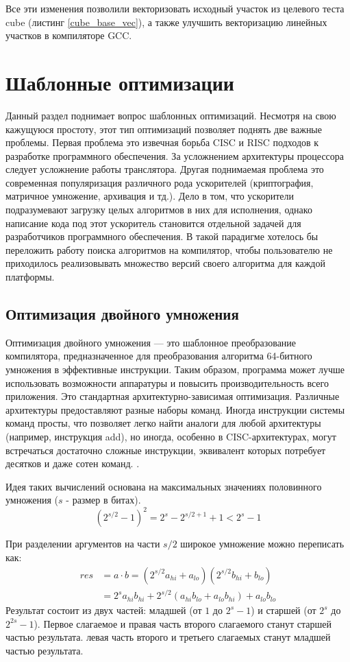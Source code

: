 Все эти изменения позволили векторизовать исходный участок из целевого теста cube (листинг \ref{cube_base_vec}), а также улучшить векторизацию линейных участков в компиляторе GCC.


\section{Шаблонные оптимизации}\label{sec:ch2/sect2}
Данный раздел поднимает вопрос шаблонных оптимизаций. Несмотря на свою кажущуюся простоту, этот тип оптимизаций позволяет поднять две важные проблемы. Первая  проблема это извечная борьба CISC и RISC подходов к разработке программного обеспечения. За усложнением архитектуры процессора следует усложнение работы транслятора. Другая поднимаемая проблема это современная популяризация различного рода ускорителей (криптография, матричное умножение, архивация и тд.). Дело в том, что ускорители подразумевают загрузку целых алгоритмов в них для исполнения, однако написание кода под этот ускоритель становится отдельной задачей для разработчиков программного обеспечения. В такой парадигме хотелось бы переложить работу поиска алгоритмов на компилятор, чтобы пользователю не приходилось реализовывать множество версий своего алгоритма для каждой платформы. 
\subsection{Оптимизация двойного умножения}
Оптимизация двойного умножения — это шаблонное преобразование компилятора, предназначенное для преобразования алгоритма 64-битного умножения в  эффективные инструкции. Таким образом, программа может лучше использовать возможности аппаратуры и повысить производительность всего приложения. Это стандартная архитектурно-зависимая оптимизация. Различные архитектуры предоставляют разные наборы команд. Иногда инструкции системы команд просты, что позволяет легко найти аналоги для любой архитектуры (например, инструкция add), но иногда, особенно в CISC-архитектурах, могут встречаться достаточно сложные инструкции, эквивалент которых потребует десятков и даже сотен команд.  \cite{bansal2021reduced, isen2009tale}.


Идея таких вычислений основана на максимальных значениях половинного умножения ($s$ - размер в битах).
\begin{equation*} \label{eq1}
	\left(2^{s/2}-1\right)^2=2^s-2^{s/2+1}+1<2^s-1
\end{equation*}

При разделении аргументов на части $s/2$ широкое умножение можно переписать как:
\begin{equation*} \label{eq2}
	\begin{split}
		res& =a\cdot b =\left(2^{s/2}a_{hi}+a_{lo}\right)\left(2^{s/2}b_{hi}+b_{lo}\right) \\
		& =2^sa_{hi}b_{hi}+2^{s/2}\left(a_{hi}b_{lo}+a_{lo}b_{hi}\right)+a_{lo}b_{lo}  
	\end{split}
\end{equation*}
Результат состоит из двух частей: младшей (от $1$ до $2^s - 1$) и старшей (от $2^s$ до $2^{2s} -1$). Первое слагаемое  и правая часть второго слагаемого станут старшей частью результата. левая часть второго и третьего слагаемых станут младшей частью результата.


